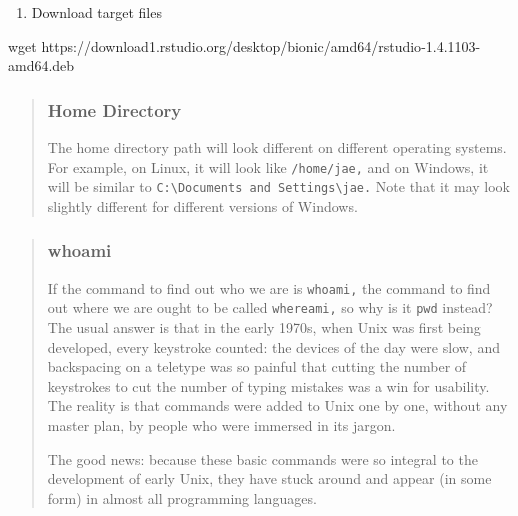 \documentclass[
  letterpaper,
  DIV=11,
  numbers=noendperiod]{scrreprt}
\newenvironment{Shaded}{\begin{snugshade}}{\end{snugshade}}
\newcommand{\FunctionTok}[1]{\textcolor[rgb]{0.28,0.35,0.67}{#1}}
\newcommand{\NormalTok}[1]{\textcolor[rgb]{0.00,0.23,0.31}{#1}}
\providecommand{\tightlist}{%
  \setlength{\itemsep}{0pt}\setlength{\parskip}{0pt}}\usepackage{longtable,booktabs,array}
\begin{document}
\begin{enumerate}
\def\labelenumi{\arabic{enumi}.}
\setcounter{enumi}{1}
\tightlist
\item
  Download target files
\end{enumerate}

\begin{Shaded}
\begin{Highlighting}[]
\FunctionTok{wget}\NormalTok{ https://download1.rstudio.org/desktop/bionic/amd64/rstudio{-}1.4.1103{-}amd64.deb}
\end{Highlighting}
\end{Shaded}

\begin{quote}
\hypertarget{home-directory}{%
\subsubsection*{Home Directory}\label{home-directory}}

The home directory path will look different on different operating
systems. For example, on Linux, it will look like \texttt{/home/jae,}
and on Windows, it will be similar to
\texttt{C:\textbackslash{}Documents\ and\ Settings\textbackslash{}jae.}
Note that it may look slightly different for different versions of
Windows.
\end{quote}

\begin{quote}
\hypertarget{whoami}{%
\subsubsection*{whoami}\label{whoami}}

If the command to find out who we are is \texttt{whoami,} the command to
find out where we are ought to be called \texttt{whereami,} so why is it
\texttt{pwd} instead? The usual answer is that in the early 1970s, when
Unix was first being developed, every keystroke counted: the devices of
the day were slow, and backspacing on a teletype was so painful that
cutting the number of keystrokes to cut the number of typing mistakes
was a win for usability. The reality is that commands were added to Unix
one by one, without any master plan, by people who were immersed in its
jargon.

The good news: because these basic commands were so integral to the
development of early Unix, they have stuck around and appear (in some
form) in almost all programming languages.
\end{quote}
\end{document}
